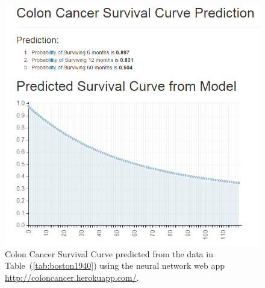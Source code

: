 \documentclass[10pt,letterpaper]{article}
\begin{document}
\begin{figure}[!ht]
  \centering
    \includegraphics[scale=.8]{boston1940}
\caption{\label{fig:boston1940} Colon Cancer Survival Curve predicted from the data in 
Table~(\ref{tab:boston1940}) using the neural network web app \url{http://coloncancer.herokuapp.com/}.}
\end{figure}



\end{document}
